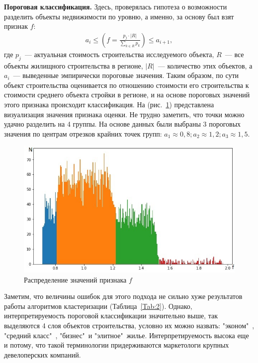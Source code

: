 \documentclass[12pt,a4paper]{article} %
\begin{document}
\newpage

\textbf{Пороговая классификация.} Здесь, проверялась гипотеза о возможности разделить объекты недвижимости по уровню, а именно, за основу был взят признак $f$:
\begin{gather}\label{pklas1}
	a_i\leq \left(f =\frac{p_j\cdot|R|}{\sum\limits_{k\in R} p_k}\right)\leq a_{i+1},
\end{gather}
где $p_j$~--- актуальная стоимость строительства исследуемого объекта, $R$~--- все объекты жилищного строительства в регионе, $|R|$~--- количество этих объектов, а $a_i$~--- выведенные эмпирически пороговые значения. Таким образом, по сути объект строительства оценивается по отношению стоимости его строительства к стоимости среднего объекта стройки в регионе, и на основе пороговых значений этого признака происходит классификация. На (рис.~\ref{fig:porclas}) представлена визуализация значения признака оценки. Не трудно заметить, что точки можно удачно разделить на 4 группы. На основе данных были выбраны 3 пороговых значения по центрам отрезков крайних точек групп: $a_1 \approx 0,8; a_2 \approx 1,2; a_3 \approx 1,5$.

\begin{figure}[h]
	
	\centering
	
	\includegraphics[width=0.8\linewidth]{porclas.jpg}
	
	\caption{Распределение значений признака $f$ }
	
	\label{fig:porclas}
	
\end{figure} 

Заметим, что величины ошибок для этого подхода не сильно хуже результатов работы алгоритмов кластеризации (Таблица~\ref{Tab:2}). Однако, интерпретируемость пороговой классификации значительно выше, так выделяются 4 слоя объектов строительства, условно их можно назвать: "эконом"\ , "средний класс"\ , "бизнес"\ и "элитное"\ жилье. Интерпретируемость высока еще и потому, что такой терминологии придерживаются маркетологи крупных девелоперских компаний. 
\end{document}
